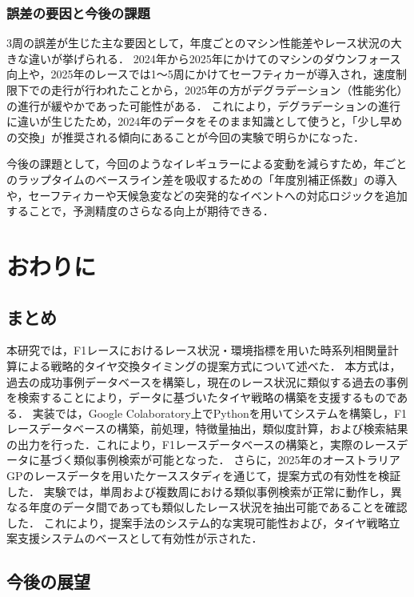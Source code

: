 \documentclass{deimj}
\begin{document}
\subsubsection{誤差の要因と今後の課題}
3周の誤差が生じた主な要因として，年度ごとのマシン性能差やレース状況の大きな違いが挙げられる．
2024年から2025年にかけてのマシンのダウンフォース向上や，2025年のレースでは1〜5周にかけてセーフティカーが導入され，速度制限下での走行が行われたことから，2025年の方がデグラデーション（性能劣化）の進行が緩やかであった可能性がある．
これにより，デグラデーションの進行に違いが生じたため，2024年のデータをそのまま知識として使うと，「少し早めの交換」が推奨される傾向にあることが今回の実験で明らかになった．

今後の課題として，今回のようなイレギュラーによる変動を減らすため，年ごとのラップタイムのベースライン差を吸収するための「年度別補正係数」の導入や，セーフティカーや天候急変などの突発的なイベントへの対応ロジックを追加することで，予測精度のさらなる向上が期待できる．

\section{おわりに}

\subsection{まとめ}

本研究では，F1レースにおけるレース状況・環境指標を用いた時系列相関量計算による戦略的タイヤ交換タイミングの提案方式について述べた．
本方式は，過去の成功事例データベースを構築し，現在のレース状況に類似する過去の事例を検索することにより，データに基づいたタイヤ戦略の構築を支援するものである．
実装では，Google Colaboratory上でPythonを用いてシステムを構築し，F1レースデータベースの構築，前処理，特徴量抽出，類似度計算，および検索結果の出力を行った．これにより，F1レースデータベースの構築と，実際のレースデータに基づく類似事例検索が可能となった．
さらに，2025年のオーストラリアGPのレースデータを用いたケーススタディを通じて，提案方式の有効性を検証した．
実験では，単周および複数周における類似事例検索が正常に動作し，異なる年度のデータ間であっても類似したレース状況を抽出可能であることを確認した．
これにより，提案手法のシステム的な実現可能性および，タイヤ戦略立案支援システムのベースとして有効性が示された．

\subsection{今後の展望}
\end{document}
